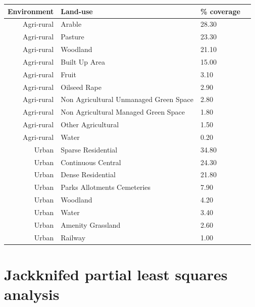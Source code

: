 \documentclass[12pt,letter]{amsart}
\begin{document}
\begin{table}[ht]
	\centering
	\begin{tabular}{rllr}
		\hline
		Environment & Land-use & \% coverage \\ 
		\hline
		Agri-rural & Arable & 28.30 \\ 
		Agri-rural & Pasture & 23.30 \\ 
		Agri-rural & Woodland & 21.10 \\ 
		Agri-rural & Built Up Area & 15.00 \\ 
		Agri-rural & Fruit & 3.10 \\ 
		Agri-rural & Oilseed Rape & 2.90 \\ 
		Agri-rural & Non Agricultural Unmanaged Green Space & 2.80 \\ 
		Agri-rural & Non Agricultural Managed Green Space & 1.80 \\ 
		Agri-rural & Other Agricultural & 1.50 \\ 
		Agri-rural & Water & 0.20 \\ 
		Urban & Sparse Residential & 34.80 \\ 
		Urban & Continuous Central & 24.30 \\ 
		Urban & Dense Residential & 21.80 \\ 
		Urban & Parks Allotments Cemeteries & 7.90 \\ 
		Urban & Woodland & 4.20 \\ 
		Urban & Water & 3.40 \\ 
		Urban & Amenity Grassland & 2.60 \\ 
		Urban & Railway & 1.00 \\ 
		\hline
	\end{tabular}
\end{table}

\section*{Jackknifed partial least squares analysis}
\end{document}
